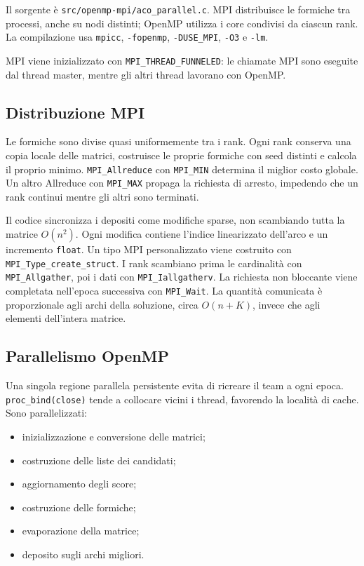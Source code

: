 \documentclass[11pt,a4paper]{article}
\begin{document}
Il sorgente è \texttt{src/openmp-mpi/aco\_parallel.c}. MPI distribuisce le
formiche tra processi, anche su nodi distinti; OpenMP utilizza i core condivisi
da ciascun rank. La compilazione usa \texttt{mpicc}, \texttt{-fopenmp},
\texttt{-DUSE\_MPI}, \texttt{-O3} e \texttt{-lm}.

MPI viene inizializzato con \texttt{MPI\_THREAD\_FUNNELED}: le chiamate MPI sono
eseguite dal thread master, mentre gli altri thread lavorano con OpenMP.

\subsection{Distribuzione MPI}

Le formiche sono divise quasi uniformemente tra i rank. Ogni rank conserva una
copia locale delle matrici, costruisce le proprie formiche con seed distinti e
calcola il proprio minimo. \texttt{MPI\_Allreduce} con \texttt{MPI\_MIN}
determina il miglior costo globale. Un altro Allreduce con \texttt{MPI\_MAX}
propaga la richiesta di arresto, impedendo che un rank continui mentre gli altri
sono terminati.

Il codice sincronizza i depositi come modifiche sparse, non scambiando tutta la
matrice $O(n^2)$. Ogni modifica contiene l'indice linearizzato dell'arco e un
incremento \texttt{float}. Un tipo MPI personalizzato viene costruito con
\texttt{MPI\_Type\_create\_struct}. I rank scambiano prima le cardinalità con
\texttt{MPI\_Allgather}, poi i dati con \texttt{MPI\_Iallgatherv}. La richiesta
non bloccante viene completata nell'epoca successiva con \texttt{MPI\_Wait}.
La quantità comunicata è proporzionale agli archi della soluzione, circa
$O(n+K)$, invece che agli elementi dell'intera matrice.

\subsection{Parallelismo OpenMP}

Una singola regione parallela persistente evita di ricreare il team a ogni
epoca. \texttt{proc\_bind(close)} tende a collocare vicini i thread, favorendo
la località di cache. Sono parallelizzati:
\begin{itemize}
  \item inizializzazione e conversione delle matrici;
  \item costruzione delle liste dei candidati;
  \item aggiornamento degli score;
  \item costruzione delle formiche;
  \item evaporazione della matrice;
  \item deposito sugli archi migliori.
\end{itemize}
\end{document}
